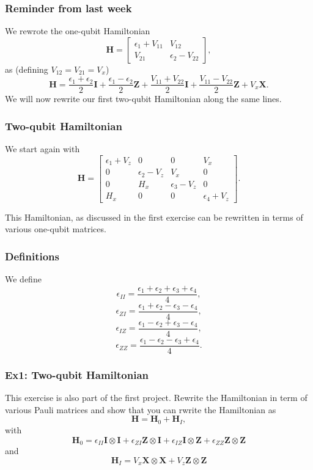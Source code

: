 \documentclass{beamer}
\begin{document}
\begin{frame}
\frametitle{Reminder from last week}

We rewrote the one-qubit Hamiltonian
\[
\bm{H}=\begin{bmatrix} \epsilon_{1}+V_{11} & V_{12}\\
                       V_{21}  & \epsilon_{2}-V_{22} \end{bmatrix},
\] 
as (defining $V_{12}=V_{21}=V_x$) 
\[
\bm{H}=\frac{\epsilon_{1}+\epsilon_{2}}{2}\bm{I}+\frac{\epsilon_{1}-\epsilon_{2}}{2}\bm{Z}+\frac{V_{11}+V_{22}}{2}\bm{I}+\frac{V_{11}-V_{22}}{2}\bm{Z}+V_x\bm{X}.
\] 
We will now rewrite our first two-qubit Hamiltonian along the same lines.
\end{frame}

\begin{frame}
\frametitle{Two-qubit Hamiltonian}

We start again with 
\[
\bm{H}=\begin{bmatrix} \epsilon_{1}+V_z & 0 & 0 & V_x \\
                       0  & \epsilon_{2}-V_z & V_x & 0 \\
		       0 & H_x & \epsilon_{3}-V_z & 0 \\
		       H_x & 0 & 0 & \epsilon_{4} +V_z \end{bmatrix}.
\] 

This Hamiltonian, as discussed in the first exercise can be rewritten in terms of various one-qubit matrices.
\end{frame}

\begin{frame}
\frametitle{Definitions}

We define
\[
\epsilon_{II}=\frac{\epsilon_{1}+\epsilon_{2}+\epsilon_{3}+\epsilon_{4}}{4},
\]
\[
\epsilon_{ZI}=\frac{\epsilon_{1}+\epsilon_{2}-\epsilon_{3}-\epsilon_{4}}{4},
\]
\[
\epsilon_{IZ}=\frac{\epsilon_{1}-\epsilon_{2}+\epsilon_{3}-\epsilon_{4}}{4},
\]
\[
\epsilon_{ZZ}=\frac{\epsilon_{1}-\epsilon_{2}-\epsilon_{3}+\epsilon_{4}}{4}.
\]
\end{frame}

\begin{frame}
\frametitle{Ex1: Two-qubit Hamiltonian}

This exercise is also part of the first project.
Rewrite the Hamiltonian in term of various Pauli matrices and show that you can rwrite the Hamiltonian as
\[
\bm{H}=\bm{H}_0+\bm{H}_I,
\]
with 
\[
\bm{H}_0=\epsilon_{II}\bm{I}\otimes\bm{I}+\epsilon_{ZI}\bm{Z}\otimes\bm{I}+\epsilon_{IZ}\bm{I}\otimes\bm{Z}+\epsilon_{ZZ}\bm{Z}\otimes\bm{Z}
\]
and 
\[
\bm{H}_I=V_x\bm{X}\otimes\bm{X}+V_z\bm{Z}\otimes\bm{Z}
\]
\end{frame}
\end{document}
